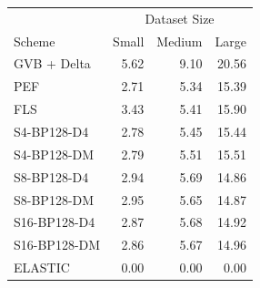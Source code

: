 \begin{tabular}{lrrr}
\toprule
 & \multicolumn{3}{c}{Dataset Size} \\
Scheme & Small & Medium & Large \\
\midrule
GVB + Delta & 5.62 & 9.10 & 20.56 \\
PEF & 2.71 & 5.34 & 15.39 \\
FLS & 3.43 & 5.41 & 15.90 \\
S4-BP128-D4 & 2.78 & 5.45 & 15.44 \\
S4-BP128-DM & 2.79 & 5.51 & 15.51 \\
S8-BP128-D4 & 2.94 & 5.69 & 14.86 \\
S8-BP128-DM & 2.95 & 5.65 & 14.87 \\
S16-BP128-D4 & 2.87 & 5.68 & 14.92 \\
S16-BP128-DM & 2.86 & 5.67 & 14.96 \\
ELASTIC & 0.00 & 0.00 & 0.00 \\
\bottomrule
\end{tabular}
